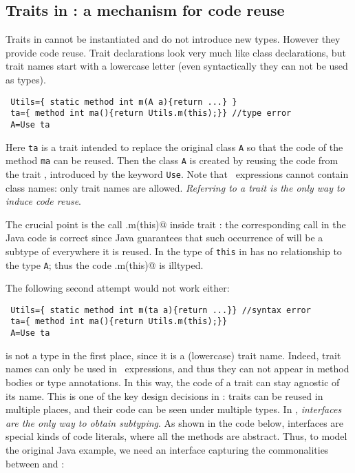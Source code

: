 \subsection{Traits in \name: a mechanism for code reuse}

Traits in \name cannot be instantiated and do not introduce new
types. However they provide code reuse.
Trait declarations 
look very much like class declarations, but trait names 
start with a lowercase letter (even syntactically they can not be used as types).

\begin{lstlisting}
 Utils={ static method int m(A a){return ...} }
 ta={ method int ma(){return Utils.m(this);}} //type error
 A=Use ta
\end{lstlisting}

\noindent Here \lstinline{ta} is a trait intended to replace the
original class \lstinline{A} so that the code of the method
\lstinline{ma} can be reused. Then the class \lstinline{A} 
is created by reusing the code from the trait \Q@ta@, introduced by the keyword 
\lstinline{Use}. Note that \use\ expressions cannot contain class names: only trait
names are allowed.
\emph{Referring to a trait is the only way to induce code reuse}.

The crucial point is the call \Q@Utils.m(this)@ inside trait \Q@ta@:
the corresponding call in the Java code is correct since Java guarantees that such occurrence of \Q@this@ will be a subtype of \Q@A@ everywhere it is reused.
In \name 
the type of \lstinline{this} in
\Q@ta@ has no relationship to the type \lstinline{A};
thus the code \Q@Utils.m(this)@ is illtyped.

The following second attempt would not work either:

\begin{lstlisting}
 Utils={ static method int m(ta a){return ...}} //syntax error
 ta={ method int ma(){return Utils.m(this);}}
 A=Use ta
\end{lstlisting}

\Q@ta@ is not a type in the first place, since it is a (lowercase) trait name.
Indeed, trait names can only be used in \use\ expressions, and thus they can not appear in method bodies or type annotations.
In this way, the code of a trait can stay agnostic of its name. This is one of the key design decisions in \name:
traits can be reused in multiple places, and their code can be seen under multiple types.
In \name, \emph{interfaces are the only way to obtain subtyping}. As shown in the code below, interfaces are special kinds of code literals, where all the methods are abstract.
Thus, to model the original Java example, we need an interface
capturing the commonalities between \Q@A@ and \Q@B@:

